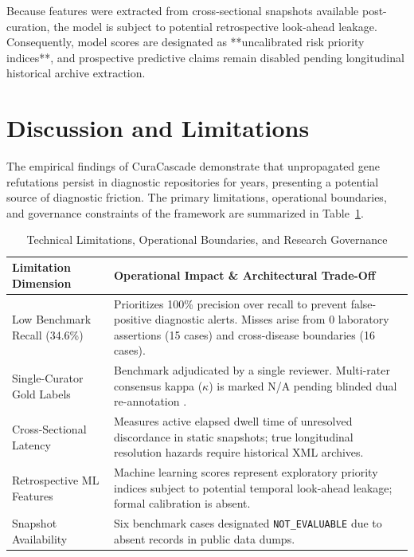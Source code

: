 \documentclass[conference]{IEEEtran}
\begin{document}
Because features were extracted from cross-sectional snapshots available post-curation, the model is subject to potential retrospective look-ahead leakage. Consequently, model scores are designated as **uncalibrated risk priority indices**, and prospective predictive claims remain disabled pending longitudinal historical archive extraction.

\section{Discussion and Limitations}
The empirical findings of CuraCascade demonstrate that unpropagated gene refutations persist in diagnostic repositories for years, presenting a potential source of diagnostic friction. The primary limitations, operational boundaries, and governance constraints of the framework are summarized in Table~\ref{tab:limitations}.

\begin{table}[t]
\caption{Technical Limitations, Operational Boundaries, and Research Governance}
\label{tab:limitations}
\centering
\begin{tabularx}{\columnwidth}{lX}
\toprule
\textbf{Limitation Dimension} & \textbf{Operational Impact \& Architectural Trade-Off} \\
\midrule
Low Benchmark Recall (34.6\%) & Prioritizes 100\% precision over recall to prevent false-positive diagnostic alerts. Misses arise from 0 laboratory assertions (15 cases) and cross-disease boundaries (16 cases). \\
Single-Curator Gold Labels & Benchmark adjudicated by a single reviewer. Multi-rater consensus kappa ($\kappa$) is marked N/A pending blinded dual re-annotation \cite{cohen1960coefficient}. \\
Cross-Sectional Latency & Measures active elapsed dwell time of unresolved discordance in static snapshots; true longitudinal resolution hazards require historical XML archives. \\
Retrospective ML Features & Machine learning scores represent exploratory priority indices subject to potential temporal look-ahead leakage; formal calibration is absent. \\
Snapshot Availability & Six benchmark cases designated \texttt{NOT\_EVALUABLE} due to absent records in public data dumps. \\
\bottomrule
\end{tabularx}
\end{table}
\end{document}

